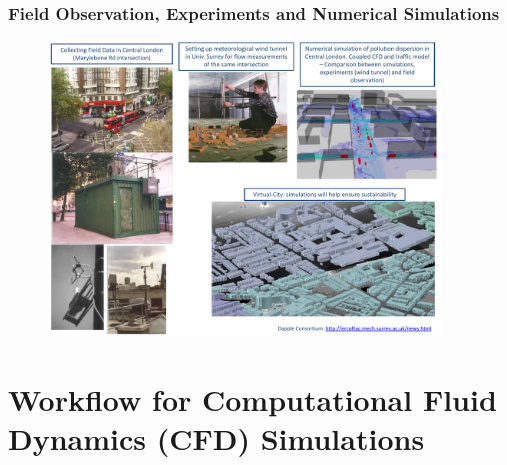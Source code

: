 \documentclass[10pt,compress]{beamer}
\begin{document}
\begin{frame}
 \frametitle{Field Observation, Experiments and Numerical Simulations} 

   \begin{figure}%
    \begin{center}
     \includegraphics[width=12.cm, height=7.8cm, clip]{./Figs/Dapple.pdf}
    \end{center}
   \end{figure}    
\end{frame}


\section{Workflow for Computational Fluid Dynamics (CFD) Simulations}
\end{document}
